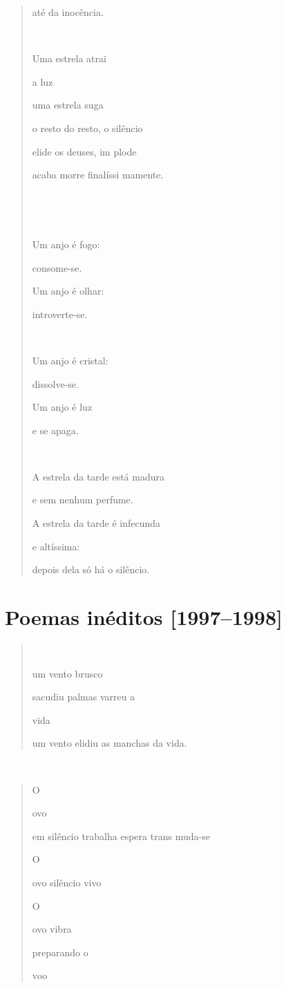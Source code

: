 \begin{quote}
até da inocência.



Uma estrela atrai

a luz

uma estrela suga

o resto do resto, o silêncio

elide os deuses, im plode

acaba morre finalíssi mamente.





Um anjo é fogo:

consome-se.

Um anjo é olhar:

introverte-se.



Um anjo é cristal:

dissolve-se.

Um anjo é luz

e se apaga.



A estrela da tarde está madura

e sem nenhum perfume.

A estrela da tarde é infecunda

e altíssima:

depois dela só há o silêncio.
\end{quote}

\section{Poemas inéditos {[}1997--1998{]}}\label{poemas-inuxe9ditos}

\begin{quote}


um vento brusco

sacudiu palmas varreu a

vida

um vento elidiu as manchas da vida.
\end{quote}



\begin{quote}
O

ovo

em silêncio trabalha espera trans muda-se

O

ovo silêncio vivo

O

ovo vibra

preparando o

voo
\end{quote}

